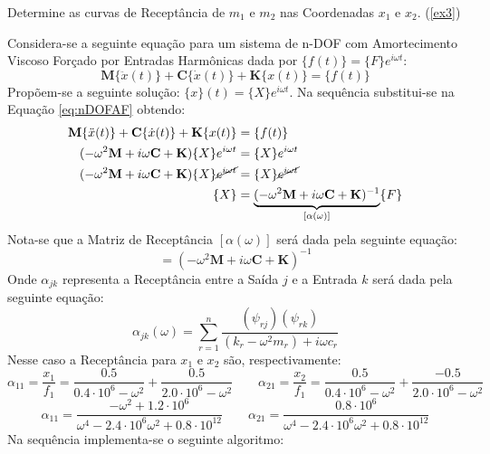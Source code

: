 \documentclass{article}
\begin{document}
\newpage\begin{exercise}\label{ex7}
    Determine as curvas de Receptância de $m_1$ e $m_2$ nas Coordenadas $x_1$ e $x_2$. (\ref{ex3})
\end{exercise}
\begin{resolution}
    Considera-se a seguinte equação para um sistema de n-DOF com Amortecimento Viscoso Forçado por Entradas Harmônicas dada por $\{f(t)\} = \{F\} e^{i\omega t}$:
    \begin{equation}
        \mathbf{M}\{\ddot{x}(t)\} + \mathbf{C}\{\dot{x}(t)\} + \mathbf{K}\{x(t)\} = \{f(t)\}
    \end{equation}
    \noindent Propõem-se a seguinte solução: $\{x\}(t) = \{X\} e^{i\omega t}$. Na sequência substitui-se na Equação \ref{eq:nDOFAF} obtendo:
    \begin{align*}
        \mathbf{M}\{\ddot{x}(t)\} + \mathbf{C}\{\dot{x}(t)\} + \mathbf{K}\{x(t)\} &= \{f(t)\}\\
        (-\omega^2\mathbf{M} + i\omega\mathbf{C} + \mathbf{K}) \{X\} e^{i\omega t} &= \{X\}e^{i\omega t}\\
        (-\omega^2\mathbf{M} + i\omega\mathbf{C} + \mathbf{K}) \{X\} \cancel{e^{i\omega t}} &= \{X\}\cancel{e^{i\omega t}}\\
        \{X\} &= \underbrace{(-\omega^2\mathbf{M} + i\omega\mathbf{C} + \mathbf{K})^{-1}}_{[\alpha(\omega)]} \{F\}
    \end{align*}
    Nota-se que a Matriz de Receptância $[\alpha(\omega)]$ será dada pela seguinte equação:
    \begin{equation}
        [\alpha(\omega)] = (-\omega^2\mathbf{M} + i\omega\mathbf{C} + \mathbf{K})^{-1}
    \end{equation}
    Onde $\alpha_{jk}$ representa a Receptância entre a Saída $j$ e a Entrada $k$ será dada pela seguinte equação:
    \begin{equation}
        \alpha_{jk} (\omega) = 
        \sum_{r=1}^{n} \frac{(\psi_{rj})(\psi_{rk})}{(k_r -\omega^2 m_r) + i\omega c_r}
    \end{equation}
    Nesse caso a Receptância para $x_1$ e $x_2$ são, respectivamente:
    \begin{equation*}
        \alpha_{11} = \frac{x_1}{f_1} = \frac{0.5}{0.4\cdot 10^6 -\omega^2} + \frac{0.5}{2.0\cdot 10^6 -\omega^2}
        \qquad
        \alpha_{21} = \frac{x_2}{f_1} = \frac{0.5}{0.4\cdot 10^6 -\omega^2} + \frac{-0.5}{2.0\cdot 10^6 -\omega^2}
    \end{equation*}
    \begin{equation*}
        \boxed{\alpha_{11} = \frac{-\omega^2 + 1.2\cdot 10^6}{\omega^4 - 2.4\cdot 10^6 \omega^2 + 0.8\cdot 10^{12}}}
        \qquad
        \boxed{\alpha_{21} = \frac{0.8\cdot 10^6}{\omega^4 - 2.4\cdot 10^6 \omega^2 + 0.8\cdot 10^{12}}}
    \end{equation*}
    Na sequência implementa-se o seguinte algoritmo:
    \begin{scriptsize}
        \myMatlab
    \end{scriptsize}
\end{resolution}
\end{document}
